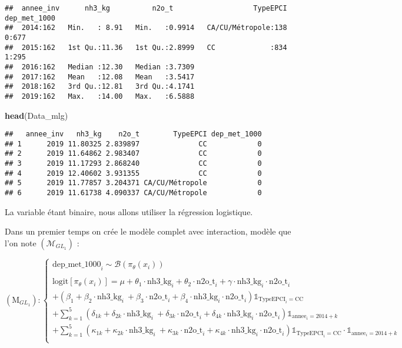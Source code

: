 \documentclass[
]{article}
\newenvironment{Shaded}{\begin{snugshade}}{\end{snugshade}}
\newcommand{\FunctionTok}[1]{\textcolor[rgb]{0.13,0.29,0.53}{\textbf{#1}}}
\newcommand{\NormalTok}[1]{#1}
\begin{document}
\begin{verbatim}
##  annee_inv      nh3_kg          n2o_t                   TypeEPCI   dep_met_1000
##  2014:162   Min.   : 8.91   Min.   :0.9914   CA/CU/Métropole:138   0:677       
##  2015:162   1st Qu.:11.36   1st Qu.:2.8999   CC             :834   1:295       
##  2016:162   Median :12.30   Median :3.7309                                     
##  2017:162   Mean   :12.08   Mean   :3.5417                                     
##  2018:162   3rd Qu.:12.81   3rd Qu.:4.1741                                     
##  2019:162   Max.   :14.00   Max.   :6.5888
\end{verbatim}

\begin{Shaded}
\begin{Highlighting}[]
\FunctionTok{head}\NormalTok{(Data\_mlg)}
\end{Highlighting}
\end{Shaded}

\begin{verbatim}
##   annee_inv   nh3_kg    n2o_t        TypeEPCI dep_met_1000
## 1      2019 11.80325 2.839897              CC            0
## 2      2019 11.64862 2.983407              CC            0
## 3      2019 11.17293 2.868240              CC            0
## 4      2019 12.40602 3.931355              CC            0
## 5      2019 11.77857 3.204371 CA/CU/Métropole            0
## 6      2019 11.61738 4.090337 CA/CU/Métropole            0
\end{verbatim}

La variable  étant binaire, nous allons utiliser la
régression logistique.

Dans un premier temps on crée le modèle complet avec interaction, modèle
que l'on note \((\mathcal{M}_{GL_{1}})\) :

\[
\begin{equation*}
(\text{M}_{GL_{1}}) : 
\begin{cases}
\text{dep_met_1000}_i \sim \mathcal{B}(\pi_\theta(x_i)) \\
\\
\text{logit}[\pi_\theta(x_i)] = \mu  +  \theta_1\cdot\text{nh3_kg}_i  + \theta_2\cdot\text{n2o_t}_i  +  \gamma\cdot\text{nh3_kg}_i\cdot\text{n2o_t}_i  \\ 
  + (\beta_1  +  \beta_2\cdot\text{nh3_kg}_i ~ + \beta_3\cdot\text{n2o_t}_i + \beta_4\cdot\text{nh3_kg}_i\cdot\text{n2o_t}_i )\mathbb{1}_{\text{TypeEPCI}_i = \text{CC}} \\
  + \sum_{k=1}^5 (\delta_{1k}  +  \delta_{2k}\cdot\text{nh3_kg}_i ~ + \delta_{3k}\cdot\text{n2o_t}_i + \delta_{4k}\cdot\text{nh3_kg}_i\cdot\text{n2o_t}_i )\mathbb{1}_{\text{annee}_i = 2014 + k} \\
  + \sum_{k=1}^5 (\kappa_{1k}  +  \kappa_{2k}\cdot\text{nh3_kg}_i ~ + \kappa_{3k}\cdot\text{n2o_t}_i + \kappa_{4k}\cdot\text{nh3_kg}_i\cdot\text{n2o_t}_i)\mathbb{1}_{\text{TypeEPCI}_i = \text{CC}}\cdot\mathbb{1}_{\text{annee}_i = 2014 + k} \\
\end{cases}
\end{equation*}
\]
\end{document}
